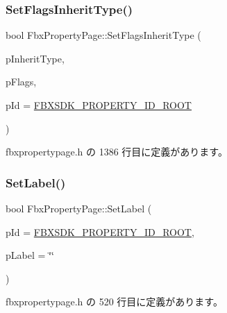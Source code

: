 \subsubsection{\texorpdfstring{Set\+Flags\+Inherit\+Type()}{SetFlagsInheritType()}}
{\footnotesize\ttfamily bool Fbx\+Property\+Page\+::\+Set\+Flags\+Inherit\+Type (\begin{DoxyParamCaption}\item[{\hyperlink{class_fbx_property_flags_ae3b667a4fcac4b827fa186a698fec2f8}{Fbx\+Property\+Flags\+::\+E\+Inherit\+Type}}]{p\+Inherit\+Type,  }\item[{\hyperlink{class_fbx_property_flags_afabfa7e0949aac8a7dcdf8a141867e99}{Fbx\+Property\+Flags\+::\+E\+Flags}}]{p\+Flags,  }\item[{\hyperlink{fbxtypes_8h_a088fa96de3b0b3ea69f0f6afef525dfb}{Fbx\+Int}}]{p\+Id = {\ttfamily \hyperlink{fbxpropertydef_8h_a291bdb6d8428dce8463143fa3aba2c34}{F\+B\+X\+S\+D\+K\+\_\+\+P\+R\+O\+P\+E\+R\+T\+Y\+\_\+\+I\+D\+\_\+\+R\+O\+OT}} }\end{DoxyParamCaption})\hspace{0.3cm}{\ttfamily [inline]}}



 fbxpropertypage.\+h の 1386 行目に定義があります。

\mbox{\label{class_fbx_property_page_a275529ba7d07a27932856d8e5eb1e936}} 
\subsubsection{\texorpdfstring{Set\+Label()}{SetLabel()}}
{\footnotesize\ttfamily bool Fbx\+Property\+Page\+::\+Set\+Label (\begin{DoxyParamCaption}\item[{\hyperlink{fbxtypes_8h_a088fa96de3b0b3ea69f0f6afef525dfb}{Fbx\+Int}}]{p\+Id = {\ttfamily \hyperlink{fbxpropertydef_8h_a291bdb6d8428dce8463143fa3aba2c34}{F\+B\+X\+S\+D\+K\+\_\+\+P\+R\+O\+P\+E\+R\+T\+Y\+\_\+\+I\+D\+\_\+\+R\+O\+OT}},  }\item[{const char $\ast$}]{p\+Label = {\ttfamily \char`\"{}\char`\"{}} }\end{DoxyParamCaption})\hspace{0.3cm}{\ttfamily [inline]}}



 fbxpropertypage.\+h の 520 行目に定義があります。

